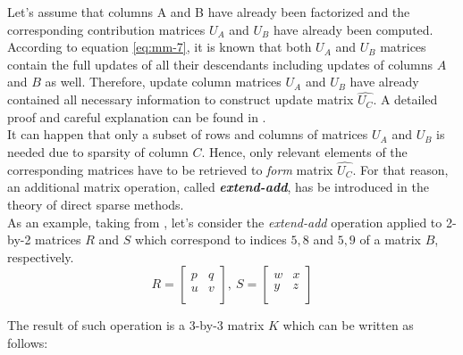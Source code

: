 Let's assume that columns A and B have already been factorized and the corresponding contribution matrices $U_{A}$ and $U_{B}$ have already been computed. According to equation \ref{eq:mm-7}, it is known that both $U_{A}$ and $U_{B}$ matrices contain the full updates of all their descendants including updates of columns $A$ and $B$ as well. Therefore, update column matrices $U_{A}$ and $U_{B}$ have already contained all necessary information to construct update matrix $\hat{U_{C}}$. A detailed proof and careful explanation can be found in \cite{mult-frontal-original:2}.\\


It can happen that only a subset of rows and columns of matrices $U_{A}$ and $U_{B}$ is needed due to sparsity of column $C$. Hence, only relevant elements of the corresponding matrices have to be retrieved to \textit{form} matrix $\hat{U_{C}}$. For that reason, an additional matrix operation, called \textbf{\textit{extend-add}}, has be introduced in the theory of direct sparse methods.\\



As an example, taking from \cite{mult-frontal-original:2}, let's consider the \textit{extend-add} operation applied to 2-by-2 matrices $R$ and $S$ which correspond to indices ${5,8}$ and ${5,9}$ of a matrix $B$, respectively.\\

\begin{equation}
R = \begin{bmatrix}
p & q \\
u & v \\
\end{bmatrix} 
,
\:
S = \begin{bmatrix}
w & x \\
y & z \\
\end{bmatrix} 
\end{equation}

The result of such operation is a 3-by-3 matrix $K$ which can be written as follows:\\

